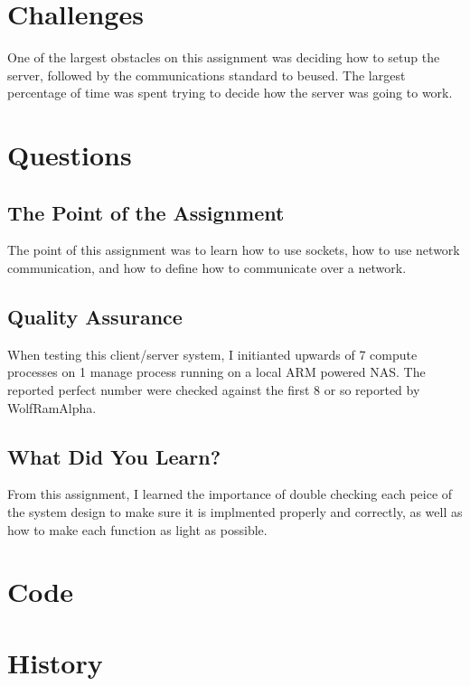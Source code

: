 \documentclass[letterpaper,10pt,titlepage]{article}
\begin{document}
\section{Challenges}
\label{Overcoming Project challenges}
One of the largest obstacles on this assignment was deciding how to setup the server, followed by the communications standard to beused. The largest percentage of time was spent trying to decide how the server was going to work.

\section{Questions}
\label{Project Quesions}
\subsection{The Point of the Assignment}
\label{Point}
The point of this assignment was to learn how to use sockets, how to use network communication, and how to define how to communicate over a network.
\subsection{Quality Assurance}
\label{QA}
When testing this client/server system, I initianted upwards of 7 compute processes on 1 manage process running on a local ARM powered NAS. The reported perfect number were checked against the first 8 or so reported by WolfRamAlpha.
\subsection{What Did You Learn?}
\label{Learned}
From this assignment, I learned the importance of double checking each peice of the system design to make sure it is implmented properly and correctly, as well as how to make each function as light as possible.


\section{Code}
\label{myar Source Code}
%
\section{History}
\end{document}

